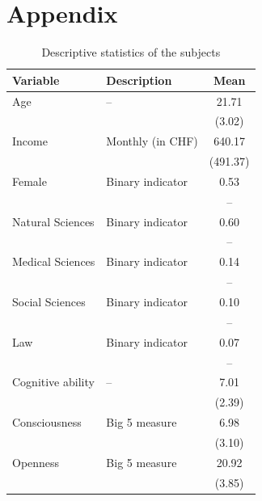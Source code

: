\documentclass[11pt,a4paper]{article}
\theoremstyle{definition}
\begin{document}



\clearpage
\appendix
\section{Appendix}
\label{sec:org5e6d1d5}
\begin{table}[!ht]
\caption{Descriptive statistics of the subjects}
\label{tab:summary}
\centering
\begin{threeparttable}
\begin{footnotesize}
\begin{tabular}{@{}llc@{}}
\toprule
\toprule
Variable          & Description & Mean     \\ \midrule
Age               &     --        & 21.71    \\
                  &             & (3.02)   \\
Income            &    Monthly (in CHF)         & 640.17   \\
                  &             & (491.37) \\
Female            &    Binary indicator         & 0.53     \\
                  &             &      --    \\
Natural Sciences  &      Binary indicator       & 0.60     \\
                  &             &     --    \\
Medical Sciences  &       Binary indicator      & 0.14     \\
                  &             &        --  \\
Social Sciences   &     Binary indicator        & 0.10     \\
                  &             &      --    \\
Law               &     Binary indicator        & 0.07     \\
                  &             &      --    \\
Cognitive ability &   --          & 7.01     \\
                  &             & (2.39)   \\
Consciousness     &     Big 5 measure        & 6.98     \\
                  &             & (3.10)   \\
Openness          &       Big 5 measure      & 20.92    \\
                  &             & (3.85)   \\

\end{tabular}
\end{footnotesize}
\end{threeparttable}
\end{table}
\end{document}
